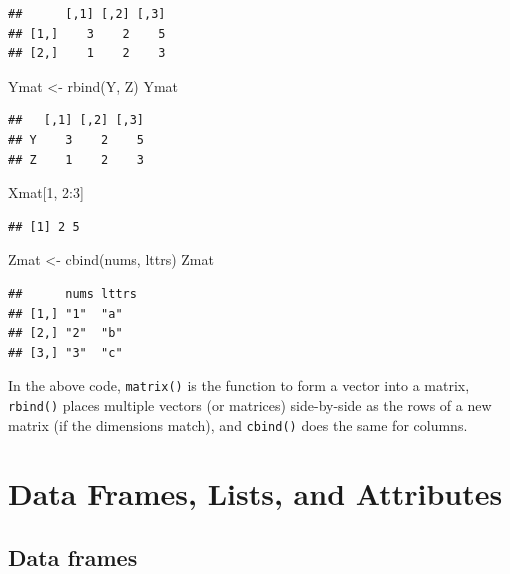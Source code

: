 \documentclass[
]{book}
\newenvironment{Shaded}{\begin{snugshade}}{\end{snugshade}}
\newcommand{\DecValTok}[1]{\textcolor[rgb]{0.00,0.00,0.81}{#1}}
\newcommand{\FunctionTok}[1]{\textcolor[rgb]{0.00,0.00,0.00}{#1}}
\newcommand{\NormalTok}[1]{#1}
\newcommand{\OtherTok}[1]{\textcolor[rgb]{0.56,0.35,0.01}{#1}}
\newcommand{\SpecialCharTok}[1]{\textcolor[rgb]{0.00,0.00,0.00}{#1}}
\begin{document}
\begin{verbatim}
##      [,1] [,2] [,3]
## [1,]    3    2    5
## [2,]    1    2    3
\end{verbatim}

\begin{Shaded}
\begin{Highlighting}[]
\NormalTok{Ymat }\OtherTok{\textless{}{-}} \FunctionTok{rbind}\NormalTok{(Y, Z)}
\NormalTok{Ymat}
\end{Highlighting}
\end{Shaded}

\begin{verbatim}
##   [,1] [,2] [,3]
## Y    3    2    5
## Z    1    2    3
\end{verbatim}

\begin{Shaded}
\begin{Highlighting}[]
\NormalTok{Xmat[}\DecValTok{1}\NormalTok{, }\DecValTok{2}\SpecialCharTok{:}\DecValTok{3}\NormalTok{]}
\end{Highlighting}
\end{Shaded}

\begin{verbatim}
## [1] 2 5
\end{verbatim}

\begin{Shaded}
\begin{Highlighting}[]
\NormalTok{Zmat }\OtherTok{\textless{}{-}} \FunctionTok{cbind}\NormalTok{(nums, lttrs)}
\NormalTok{Zmat}
\end{Highlighting}
\end{Shaded}

\begin{verbatim}
##      nums lttrs
## [1,] "1"  "a"  
## [2,] "2"  "b"  
## [3,] "3"  "c"
\end{verbatim}

In the above code, \texttt{matrix()} is the function to form a vector into a matrix, \texttt{rbind()} places multiple vectors (or matrices) side-by-side as the rows of a new matrix (if the dimensions match), and \texttt{cbind()} does the same for columns.

\hypertarget{data-frames-lists-and-attributes}{%
\section{Data Frames, Lists, and Attributes}\label{data-frames-lists-and-attributes}}

\hypertarget{data-frames}{%
\subsection*{Data frames}\label{data-frames}}
\end{document}

